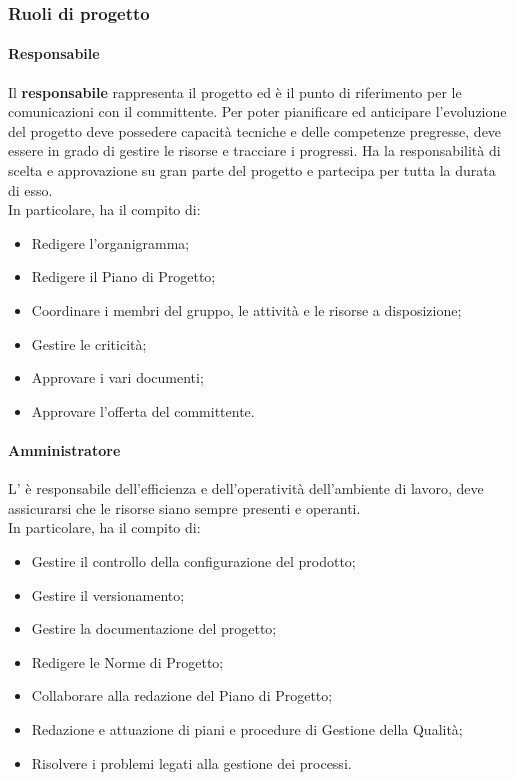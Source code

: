 \documentclass[../norme_di_progetto.tex]{subfiles}
\begin{document}
    \subsubsection{Ruoli di progetto}
        \paragraph{Responsabile}
        Il \textbf{responsabile} rappresenta il progetto ed è il punto di riferimento per le comunicazioni con il committente. Per poter pianificare ed anticipare l'evoluzione del progetto deve possedere capacità tecniche e delle competenze pregresse, deve essere in grado di gestire le risorse e tracciare i progressi. Ha la responsabilità di scelta e approvazione su gran parte del progetto e partecipa per tutta la durata di esso.\\
        In particolare, ha il compito di:
        \begin{itemize}
            \item Redigere l'organigramma;
            \item Redigere il Piano di Progetto;
            \item Coordinare i membri del gruppo, le attività e le risorse a disposizione;
            \item Gestire le criticità;
            \item Approvare i vari documenti;
            \item Approvare l'offerta del committente.
        \end{itemize}

        \paragraph{Amministratore}
        L'\textbf{} è responsabile dell'efficienza e dell'operatività dell'ambiente di lavoro, deve assicurarsi che le risorse siano sempre presenti e operanti.\\
        In particolare, ha il compito di:
        \begin{itemize}
            \item Gestire il controllo della configurazione del prodotto;
            \item Gestire il versionamento;
            \item Gestire la documentazione del progetto;
            \item Redigere le Norme di Progetto;
            \item Collaborare alla redazione del Piano di Progetto;
            \item Redazione e attuazione di piani e procedure di Gestione della Qualità;
            \item Risolvere i problemi legati alla gestione dei processi.
        \end{itemize}
        
\end{document}

